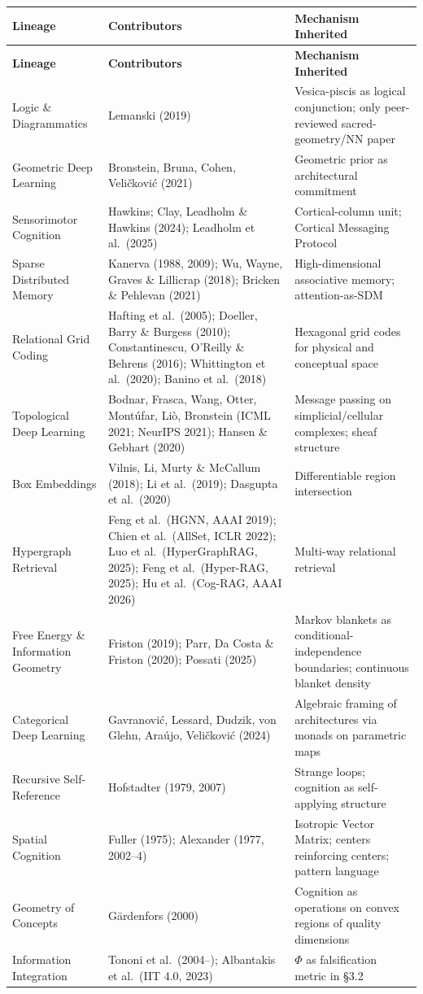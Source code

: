\documentclass[11pt,a4paper]{article}
\begin{document}
\begin{longtable}{>{\raggedright\arraybackslash}p{3.5cm}>{\raggedright\arraybackslash}p{5.5cm}>{\raggedright\arraybackslash}p{5.5cm}}
\toprule
\textbf{Lineage} & \textbf{Contributors} & \textbf{Mechanism Inherited} \\
\midrule
\endfirsthead
\toprule
\textbf{Lineage} & \textbf{Contributors} & \textbf{Mechanism Inherited} \\
\midrule
\endhead
Logic \& Diagrammatics & Lemanski (2019) & Vesica-piscis as logical conjunction; only peer-reviewed sacred-geometry/NN paper \\
Geometric Deep Learning & Bronstein, Bruna, Cohen, Veli\v{c}kovi\'c (2021) & Geometric prior as architectural commitment \\
Sensorimotor Cognition & Hawkins; Clay, Leadholm \& Hawkins (2024); Leadholm et al.\ (2025) & Cortical-column unit; Cortical Messaging Protocol \\
Sparse Distributed Memory & Kanerva (1988, 2009); Wu, Wayne, Graves \& Lillicrap (2018); Bricken \& Pehlevan (2021) & High-dimensional associative memory; attention-as-SDM \\
Relational Grid Coding & Hafting et al.\ (2005); Doeller, Barry \& Burgess (2010); Constantinescu, O'Reilly \& Behrens (2016); Whittington et al.\ (2020); Banino et al.\ (2018) & Hexagonal grid codes for physical and conceptual space \\
Topological Deep Learning & Bodnar, Frasca, Wang, Otter, Mont\'ufar, Li\`o, Bronstein (ICML 2021; NeurIPS 2021); Hansen \& Gebhart (2020) & Message passing on simplicial/cellular complexes; sheaf structure \\
Box Embeddings & Vilnis, Li, Murty \& McCallum (2018); Li et al.\ (2019); Dasgupta et al.\ (2020) & Differentiable region intersection \\
Hypergraph Retrieval & Feng et al.\ (HGNN, AAAI 2019); Chien et al.\ (AllSet, ICLR 2022); Luo et al.\ (HyperGraphRAG, 2025); Feng et al.\ (Hyper-RAG, 2025); Hu et al.\ (Cog-RAG, AAAI 2026) & Multi-way relational retrieval \\
Free Energy \& Information Geometry & Friston (2019); Parr, Da Costa \& Friston (2020); Possati (2025) & Markov blankets as conditional-independence boundaries; continuous blanket density \\
Categorical Deep Learning & Gavranovi\'c, Lessard, Dudzik, von Glehn, Ara\'ujo, Veli\v{c}kovi\'c (2024) & Algebraic framing of architectures via monads on parametric maps \\
Recursive Self-Reference & Hofstadter (1979, 2007) & Strange loops; cognition as self-applying structure \\
Spatial Cognition & Fuller (1975); Alexander (1977, 2002--4) & Isotropic Vector Matrix; centers reinforcing centers; pattern language \\
Geometry of Concepts & G\"ardenfors (2000) & Cognition as operations on convex regions of quality dimensions \\
Information Integration & Tononi et al.\ (2004--); Albantakis et al.\ (IIT 4.0, 2023) & $\Phi$ as falsification metric in \S 3.2 \\
\bottomrule
\end{longtable}
\end{document}
